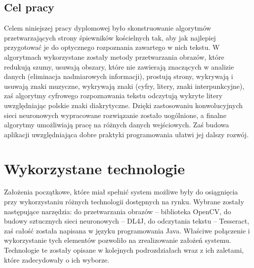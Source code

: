 \documentclass[a4paper,12pt]{article}
\newcommand\spacingIndent{2.2em}
\begin{document}
\begin{minipage}[s]{\textwidth}
		\subsection{Cel pracy}
			\hspace{\spacingIndent} Celem niniejszej pracy dyplomowej było skonstruowanie algorytmów przetwarzających strony śpiewników kościelnych tak, 
				aby jak najlepiej przygotować je do optycznego rozpoznania zawartego w nich tekstu. W algorytmach wykorzystane zostały metody przetwarzania obrazów, 
				które redukują szumy, usuwają obszary, które nie zawierają znaczących w analizie danych (eliminacja nadmiarowych informacji), 
				prostują strony, wykrywają i usuwają znaki muzyczne, wykrywają znaki (cyfry, litery, znaki interpunkcyjne), 
				zaś algorytmy cyfrowego rozpoznawania tekstu odczytują wykryte litery uwzględniając polskie znaki diakrytyczne. 
				Dzięki zastosowaniu konwolucyjnych sieci neuronowych wypracowane rozwiązanie zostało uogólnione, a \nopagebreak finalne algorytmy umożliwiają pracę 
				na różnych danych wejściowych. Zaś budowa aplikacji uwzględniająca dobre praktyki programowania ułatwi jej dalszy rozwój.
				
		\end{minipage}
				
	\newpage 

	\section{Wykorzystane technologie}
	    \hspace{\spacingIndent} Założenia początkowe, które miał spełnić system możliwe były do osiągnięcia przy wykorzystaniu różnych technologii dostępnych na rynku. Wybrane zostały następujące narzędzia: do przetwarzania obrazów -- biblioteka OpenCV, do budowy sztucznych sieci neuronowych -- DL4J, do odczytania tekstu -- Tesseract, zaś całość została napisana w języku programowania Java. Właściwe połączenie i wykorzystanie tych elementów pozwoliło na zrealizowanie założeń systemu. Technologie te zostały opisane w kolejnych podrozdziałach wraz z ich zaletami, które zadecydowały o ich wyborze.
	    
\end{document}
